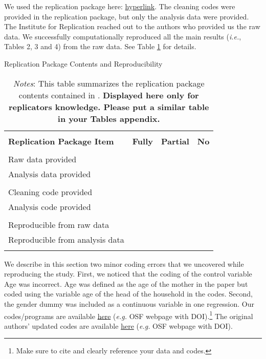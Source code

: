 \documentclass[12pt,a4paper]{article}
\begin{document}
\begin{spacing}{1.5}
We used the replication package here: \href{https://youtu.be/dQw4w9WgXcQ?si=0Yf0yZeha80GyZll}{hyperlink}. The cleaning codes were provided in the replication package, but only the analysis data were provided. The Institute for Replication reached out to the authors who provided us the raw data. We successfully computationally reproduced all the main results (\textit{i.e.}, Tables 2, 3 and 4) from the raw data. See Table \ref{tab:reppkg_table} for details.

\begin{table}[h]
\centering
\caption{Replication Package Contents and Reproducibility}
\label{tab:reppkg_table}
\footnotesize 
	\begin{tabular}{lccc}
	\hline \hline
	\\
	\textbf{Replication Package Item} 	& \textbf{Fully} & \textbf{Partial} & \textbf{No} \\
	\hline
	\\
	Raw data provided                 	& \checkmark &  &  \\ 
	Analysis data provided				& \checkmark &  &  \\ 
	\\
	Cleaning code provided				& &  & \checkmark \\ 
	Analysis code provided				& \checkmark &  & \checkmark \\ 
	\\
	Reproducible from raw data			&  &  & \checkmark \\ 
	Reproducible from analysis data		& \checkmark &  &  \\ 
	\\
	\hline \hline
	\end{tabular}
\caption*{
\footnotesize \emph{Notes}: This table summarizes the replication package contents contained in \cite{analyst_2022}. \textbf{Displayed here only for replicators knowledge. Please put a similar table in your Tables appendix.}}
\end{table}

We describe in this section two minor coding errors that we uncovered while reproducing the study. First, we noticed that the coding of the control variable Age was incorrect. Age was defined as the age of the mother in the paper but coded using the variable age of the head of the household in the codes. Second, the gender dummy was included as a continuous variable in one regression. Our codes/programs are available \href{https://youtu.be/dQw4w9WgXcQ?si=0Yf0yZeha80GyZll}{here} (\textit{e.g.} OSF webpage with DOI).\footnote{Make sure to cite and clearly reference your data and codes.} The original authors' updated codes are available \href{https://youtu.be/dQw4w9WgXcQ?si=0Yf0yZeha80GyZll}{here} (\textit{e.g.} OSF webpage with DOI).


\end{spacing}
\end{document}
